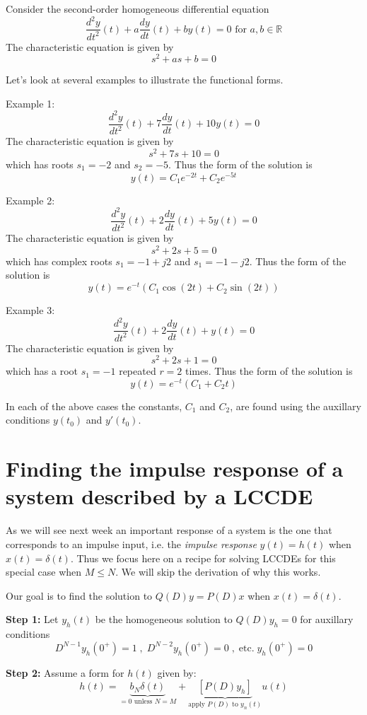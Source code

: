 Consider the second-order homogeneous differential equation
\[
\frac{d^2y}{dt^2}(t) + a\frac{dy}{dt}(t) + by(t) = 0 \mbox{ for } a,b \in \mathbb{R}
\]
The characteristic equation is given by
\[
s^2 + as + b = 0
\]

Let's look at several examples to illustrate the functional forms.

Example 1:
\[
\frac{d^2y}{dt^2}(t) + 7\frac{dy}{dt}(t) + 10y(t) = 0 
\]
The characteristic equation is given by
\[
s^2 + 7s + 10 = 0
\]
which has roots $s_1 = -2$ and $s_2 = -5$. Thus the form of the solution is
\[
y(t) = C_1e^{-2t} + C_2e^{-5t}
\]

Example 2:
\[
\frac{d^2y}{dt^2}(t) + 2\frac{dy}{dt}(t) + 5y(t) = 0 
\]
The characteristic equation is given by
\[
s^2 + 2s + 5 = 0
\]
which has complex roots $s_1 = -1+j2$ and $s_1 = -1-j2$. Thus the form of the solution is
\[
y(t) = e^{-t}\left(C_1\cos(2t) + C_2\sin(2t)\right)
\]

Example 3:
\[
\frac{d^2y}{dt^2}(t) + 2\frac{dy}{dt}(t) + y(t) = 0 
\]
The characteristic equation is given by
\[
s^2 + 2s + 1 = 0
\]
which has a root $s_1 = -1$ repeated $r=2$ times. Thus the form of the solution is
\[
y(t) = e^{-t}\left(C_1 + C_2t\right)
\]

In each of the above cases the constants, $C_1$ and $C_2$, are found using the auxillary conditions $y(t_0)$ and $y\prime(t_0)$.

\section{Finding the impulse response of a system described by a LCCDE}

As we will see next week an important response of a system is the one that corresponds to an impulse input, i.e. the \emph{impulse response} $y(t) = h(t)$ when $x(t) = \delta(t)$. Thus we focus here on a recipe for solving LCCDEs for this special case when $M \leq N$. We will skip the derivation of why this works.

Our goal is to find the solution to $Q(D)y = P(D)x$ when $x(t)=\delta(t)$.

\textbf{Step 1:} Let $y_h(t)$ be the homogeneous solution to $Q(D)y_h = 0$ for auxillary conditions
  \[
    D^{N-1}y_h(0^+) = 1 \; , \; D^{N-2}y_h(0^+) = 0 \; , \; \text{etc.} \; y_h(0^+) = 0 
    \]
    
\textbf{Step 2:} Assume a form for $h(t)$ given by:
  \[
  h(t) = \underbrace{b_N\delta(t)}_{=0 \text{ unless } N=M} + \underbrace{\left[ P(D)y_h\right]}_{\text{apply } P(D) \text{ to } y_n(t)}u(t)
  \]

